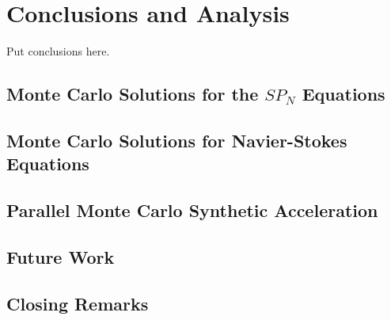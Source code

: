 \chapter{Conclusions and Analysis}
\label{ch:conclusion}
Put conclusions here.

\section{Monte Carlo Solutions for the $SP_N$ Equations}
\label{sec:spn_conclusion}

\section{Monte Carlo Solutions for Navier-Stokes Equations}
\label{sec:nonlinear_conclusions}

\section{Parallel Monte Carlo Synthetic Acceleration}
\label{sec:parallel_mc_conclusions}

\section{Future Work}
\label{sec:future_work}

\section{Closing Remarks}
\label{sec:closing}
